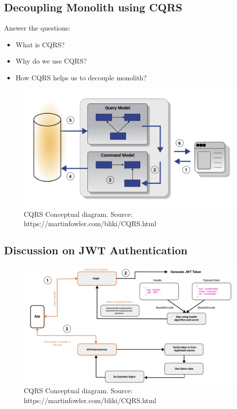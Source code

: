 \subsection{Decoupling Monolith using CQRS}\label{subsec:decoupling-monolith-using-cqrs}
Answer the questions:
\begin{itemize}
    \item What is CQRS?
    \item Why do we use CQRS?
    \item How CQRS helps us to decouple monolith?
\end{itemize}
\begin{figure}[H]
    \centering
    \includegraphics[width=1\textwidth]{Pictures/cqrs.pdf}
    \caption{CQRS Conceptual diagram. Source: https://martinfowler.com/bliki/CQRS.html}\label{fig:figure}
\end{figure}

\subsection{Discussion on JWT Authentication}\label{subsec:discussion-on-jwt-authentication}
\begin{figure}[H]
    \centering
    \includegraphics[width=1\textwidth]{Pictures/jwt_auth_scheme.pdf}
    \caption{CQRS Conceptual diagram. Source: https://martinfowler.com/bliki/CQRS.html}\label{fig:figure3}
\end{figure}

